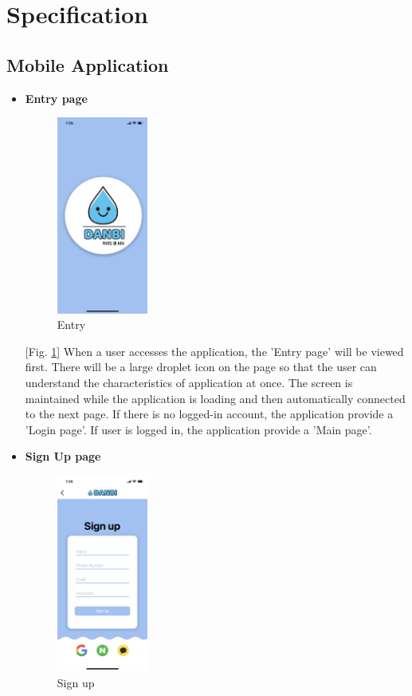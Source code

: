 \documentclass[conference]{IEEEtran}
\begin{document}
\section{Specification}

\subsection{Mobile Application}\label{AA}
\begin{itemize}
\setlength{\parindent}{2ex}
\setlength{\parskip}{0.5em}
\item \textbf{Entry page}

\par \begin{figure}[h!]
\includegraphics[width=3cm]{page/entry.png}
\centering
\caption{Entry}
\label{fig:entry}
\end{figure}

[Fig. \ref{fig:entry}] When a user accesses the application, the 'Entry page' will be viewed first. There will be a large droplet icon on the page so that the user can understand the characteristics of application at once. The screen is maintained while the application is loading and then automatically connected to the next page. If there is no logged-in account, the application provide a 'Login page'. If user is logged in, the application provide a 'Main page'.

\item \textbf{Sign Up page}

\par \begin{figure}[h!]
\includegraphics[width=3cm]{page/signUp.png}
\centering
\caption{Sign up}
\label{fig:signup}
\end{figure}


\end{itemize}
\end{document}

